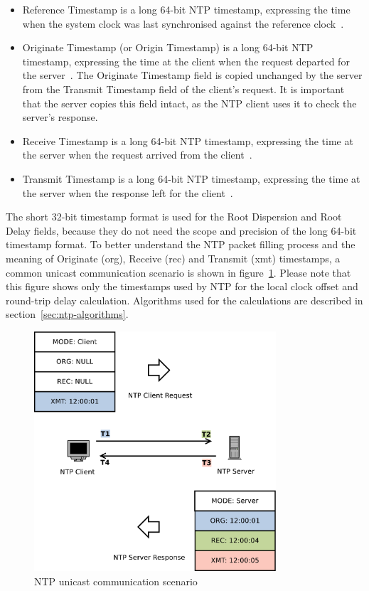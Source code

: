 \begin{itemize}
Kiss codes are particularly used by the server to tell the client to stop sending packets or
to increase its polling interval.
For stratum 1, this is a four-octet, left-justified, zero-padded ASCII
string assigned to the reference clock (e.g. "GPS" when synchronising against the Global Position System clock).
Above stratum 1, this is the reference identifier of the server used for synchronisation
and can be used by the client together with the stratum field to detect loops in the NTP hierarchy.
If communicating over IPv4, the identifier is IPv4 address.
If communicating over IPv6, it is the first four octets of the MD5 hash of the IPv6 address~\cite{rfc5905}.
\item
Reference Timestamp is a long 64-bit NTP timestamp, expressing the time
when the system clock was last synchronised against the reference clock~\cite{rfc5905}.
\item
Originate Timestamp (or Origin Timestamp) is a long 64-bit NTP timestamp, expressing the time
at the client when the request departed for the server~\cite{rfc5905}.
The Originate Timestamp field is copied
unchanged by the server from the Transmit Timestamp field of the client's request.
It is important that the server copies this field intact,
as the NTP client uses it to check the server's response.
\item
Receive Timestamp is a long 64-bit NTP timestamp, expressing the time
at the server when the request arrived from the client~\cite{rfc5905}.
\item
Transmit Timestamp is a long 64-bit NTP timestamp, expressing the time
at the server when the response left for the client~\cite{rfc5905}.
\end{itemize}

The short 32-bit timestamp format is used for the Root Dispersion and Root Delay fields,
because they do not need the scope and precision of the long 64-bit timestamp format.
To better understand the NTP packet filling process and the meaning of
Originate (org), Receive (rec) and Transmit (xmt) timestamps,
a common unicast communication scenario is shown in figure~\ref{fig:ntp-client-server}.
Please note that this figure shows only the
timestamps used by NTP for the local clock offset and round-trip delay calculation.
Algorithms used for the calculations are described in section~\ref{sec:ntp-algorithms}.

\begin{figure}
	\centering
	\includegraphics[width=9cm,keepaspectratio]{fig/ntp-client-server.pdf}
	\caption{NTP unicast communication scenario}
	\label{fig:ntp-client-server}
\end{figure}
